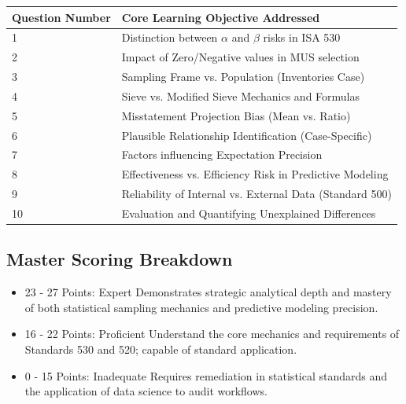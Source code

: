 \documentclass[12pt,a4paper]{memoir}
\begin{document}
\begin{tabular}{@{}ll@{}}
\toprule
Question Number & Core Learning Objective Addressed \\
\midrule
1 & Distinction between $\alpha$ and $\beta$ risks in ISA 530 \\
2 & Impact of Zero/Negative values in MUS selection \\
3 & Sampling Frame vs. Population (Inventories Case) \\
4 & Sieve vs. Modified Sieve Mechanics and Formulas \\
5 & Misstatement Projection Bias (Mean vs. Ratio) \\
6 & Plausible Relationship Identification (Case-Specific) \\
7 & Factors influencing Expectation Precision \\
8 & Effectiveness vs. Efficiency Risk in Predictive Modeling \\
9 & Reliability of Internal vs. External Data (Standard 500) \\
10 & Evaluation and Quantifying Unexplained Differences \\
\bottomrule
\end{tabular}

\subsection{Master Scoring Breakdown}

\begin{itemize}
\item 23 - 27 Points: Expert Demonstrates strategic analytical depth and mastery of both statistical sampling mechanics and predictive modeling precision.
\item 16 - 22 Points: Proficient Understand the core mechanics and requirements of Standards 530 and 520; capable of standard application.
\item 0 - 15 Points: Inadequate Requires remediation in statistical standards and the application of data science to audit workflows.
\end{itemize}
\end{document}
